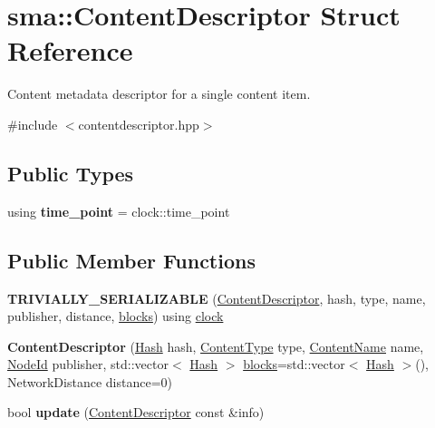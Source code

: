 \hypertarget{structsma_1_1ContentDescriptor}{\section{sma\-:\-:Content\-Descriptor Struct Reference}
\label{structsma_1_1ContentDescriptor}
}


Content metadata descriptor for a single content item.  




{\ttfamily \#include $<$contentdescriptor.\-hpp$>$}

\subsection*{Public Types}
\begin{DoxyCompactItemize}
\item 
\hypertarget{structsma_1_1ContentDescriptor_a68b7045d54a2826abbd6fb6d393b77f3}{using {\bfseries time\-\_\-point} = clock\-::time\-\_\-point}\label{structsma_1_1ContentDescriptor_a68b7045d54a2826abbd6fb6d393b77f3}

\end{DoxyCompactItemize}
\subsection*{Public Member Functions}
\begin{DoxyCompactItemize}
\item 
\hypertarget{structsma_1_1ContentDescriptor_a65b2a03a56aa38d2eff2915a12c5fcdd}{{\bfseries T\-R\-I\-V\-I\-A\-L\-L\-Y\-\_\-\-S\-E\-R\-I\-A\-L\-I\-Z\-A\-B\-L\-E} (\hyperlink{structsma_1_1ContentDescriptor}{Content\-Descriptor}, hash, type, name, publisher, distance, \hyperlink{structsma_1_1ContentDescriptor_a5df5403d4d7e7a93ae3bf616f14eb598}{blocks}) using \hyperlink{structsma_1_1chrono_1_1system__clock}{clock}}\label{structsma_1_1ContentDescriptor_a65b2a03a56aa38d2eff2915a12c5fcdd}

\item 
\hypertarget{structsma_1_1ContentDescriptor_a7fab147dff32e4389e9293e19e8080ba}{{\bfseries Content\-Descriptor} (\hyperlink{structsma_1_1Hash}{Hash} hash, \hyperlink{structsma_1_1ContentType}{Content\-Type} type, \hyperlink{structsma_1_1ContentName}{Content\-Name} name, \hyperlink{structsma_1_1NodeId}{Node\-Id} publisher, std\-::vector$<$ \hyperlink{structsma_1_1Hash}{Hash} $>$ \hyperlink{structsma_1_1ContentDescriptor_a5df5403d4d7e7a93ae3bf616f14eb598}{blocks}=std\-::vector$<$ \hyperlink{structsma_1_1Hash}{Hash} $>$(), Network\-Distance distance=0)}\label{structsma_1_1ContentDescriptor_a7fab147dff32e4389e9293e19e8080ba}

\item 
\hypertarget{structsma_1_1ContentDescriptor_af9e1493085aa1666af655673abe97206}{bool {\bfseries update} (\hyperlink{structsma_1_1ContentDescriptor}{Content\-Descriptor} const \&info)}\label{structsma_1_1ContentDescriptor_af9e1493085aa1666af655673abe97206}

\end{DoxyCompactItemize}
